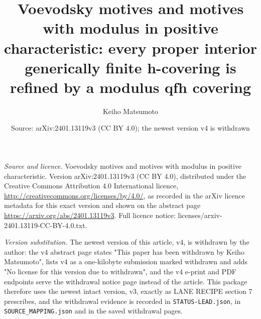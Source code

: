 \documentclass[10pt,a4paper]{amsart}
\title[Voevodsky motives and motives with modulus]{Voevodsky motives and motives with modulus in positive characteristic: every proper interior generically finite h-covering is refined by a modulus qfh covering}
\author{Keiho Matsumoto}
\date{Source: arXiv:2401.13119v3 (CC BY 4.0); the newest version v4 is withdrawn}
\theoremstyle{plain}
\begin{document}
\maketitle
\noindent\emph{Source and licence.} Voevodsky motives and motives with modulus in positive characteristic. Version arXiv:2401.13119v3 (CC BY 4.0), distributed under the Creative Commons Attribution 4.0 International licence, \url{http://creativecommons.org/licenses/by/4.0/}, as recorded in the arXiv licence metadata for this exact version and shown on the abstract page \url{https://arxiv.org/abs/2401.13119v3}. Full licence notice: licenses/arxiv-2401.13119-CC-BY-4.0.txt.\par\smallskip

\noindent\emph{Version substitution.} The newest version of this article, v4, is withdrawn by the author: the v4 abstract page states "This paper has been withdrawn by Keiho Matsumoto", lists v4 as a one-kilobyte submission marked withdrawn and adds "No license for this version due to withdrawn", and the v4 e-print and PDF endpoints serve the withdrawal notice page instead of the article. This package therefore uses the newest intact version, v3, exactly as LANE RECIPE section 7 prescribes, and the withdrawal evidence is recorded in \texttt{STATUS-LEAD.json}, in \texttt{SOURCE\_MAPPING.json} and in the saved withdrawal pages.\par\smallskip
\end{document}
